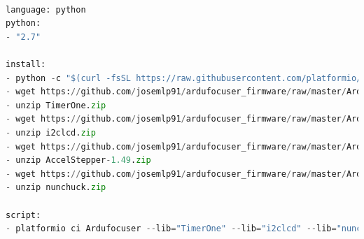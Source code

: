 \newpage
\begin{lstlisting}[language=python, caption={Script travis para realizar integración continua},label={lst:write_read_serial_port_sample}]

language: python
python:
- "2.7"

install:
- python -c "$(curl -fsSL https://raw.githubusercontent.com/platformio/platformio/master/scripts/get-platformio.py)"
- wget https://github.com/josemlp91/ardufocuser_firmware/raw/master/Ardufocuser/libs/TimerOne.zip
- unzip TimerOne.zip
- wget https://github.com/josemlp91/ardufocuser_firmware/raw/master/Ardufocuser/libs/i2clcd.zip
- unzip i2clcd.zip
- wget https://github.com/josemlp91/ardufocuser_firmware/raw/master/Ardufocuser/libs/AccelStepper-1.49.zip
- unzip AccelStepper-1.49.zip
- wget https://github.com/josemlp91/ardufocuser_firmware/raw/master/Ardufocuser/libs/nunchuck.zip
- unzip nunchuck.zip

script:
- platformio ci Ardufocuser --lib="TimerOne" --lib="i2clcd" --lib="nunchuck" --lib="AccelStepper" --board=uno

\end{lstlisting}

